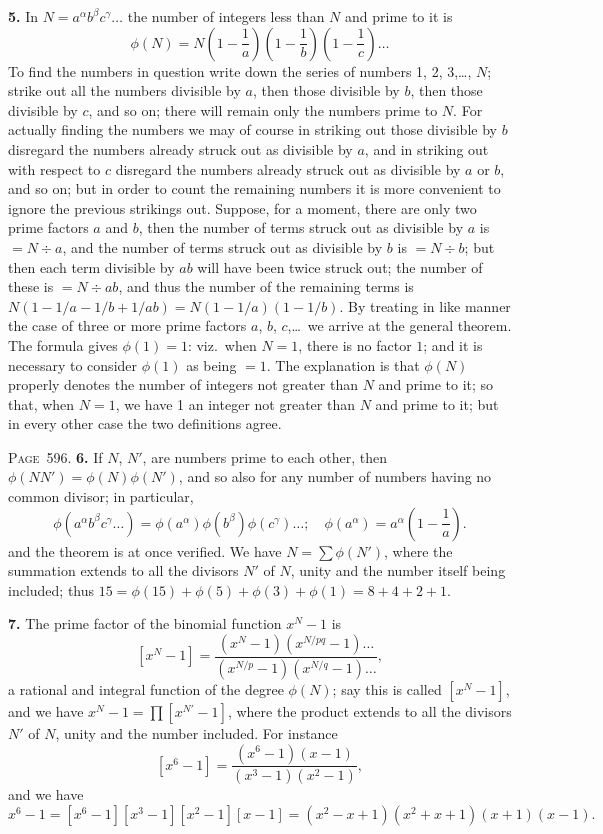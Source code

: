 \documentclass[11pt,a4paper]{book}
\begin{document}
\textbf{5.} In $N=a^\alpha b^\beta c^\gamma\ldots$ the number of integers less than $N$ and prime to it is
\[
\phi(N)=N\left(1-\frac{1}{a}\right)\left(1-\frac{1}{b}\right)\left(1-\frac{1}{c}\right)\ldots
\]
To find the numbers in question write down the series of numbers 1, 2, 3,\ldots, $N$; strike out all the numbers divisible by $a$, then those divisible by $b$, then those divisible by $c$, and so on; there will remain only the numbers prime to $N$. For actually finding the numbers we may of course in striking out those divisible by $b$ disregard the numbers already struck out as divisible by $a$, and in striking out with respect to $c$ disregard the numbers already struck out as divisible by $a$ or $b$, and so on; but in order to count the remaining numbers it is more convenient to ignore the previous strikings out. Suppose, for a moment, there are only two prime factors $a$ and $b$, then the number of terms struck out as divisible by $a$ is $=N\div a$, and the number of terms struck out as divisible by $b$ is $=N\div b$; but then each term divisible by $ab$ will have been twice struck out; the number of these is $=N\div ab$, and thus the number of the remaining terms is $N(1-1/a-1/b+1/ab)=N(1-1/a)(1-1/b)$. By treating in like manner the case of three or more prime factors $a$, $b$, $c$,\ldots\ we arrive at the general theorem. The formula gives $\phi(1)=1$: viz.\ when $N=1$, there is no factor $1$; and it is necessary to consider $\phi(1)$ as being $=1$. The explanation is that $\phi(N)$ properly denotes the number of integers not greater than $N$ and prime to it; so that, when $N=1$, we have 1 an integer not greater than $N$ and prime to it; but in every other case the two definitions agree.

\newpage
\noindent\textsc{Page~596.} \textbf{6.} If $N$, $N'$, are numbers prime to each other, then $\phi(NN')=\phi(N)\phi(N')$, and so also for any number of numbers having no common divisor; in particular,
\[
\phi(a^\alpha b^\beta c^\gamma\ldots)=\phi(a^\alpha)\phi(b^\beta)\phi(c^\gamma)\ldots;\quad
\phi(a^\alpha)=a^\alpha\left(1-\frac{1}{a}\right).
\]
and the theorem is at once verified. We have $N=\sum\phi(N')$, where the summation extends to all the divisors $N'$ of $N$, unity and the number itself being included; thus $15=\phi(15)+\phi(5)+\phi(3)+\phi(1)=8+4+2+1$.

\textbf{7.} The prime factor of the binomial function $x^N-1$ is
\[
[x^N-1]=\frac{(x^N-1)(x^{N/pq}-1)\ldots}{(x^{N/p}-1)(x^{N/q}-1)\ldots},
\]
a rational and integral function of the degree $\phi(N)$; say this is called $[x^N-1]$, and we have $x^N-1=\prod[x^{N'}-1]$, where the product extends to all the divisors $N'$ of $N$, unity and the number included. For instance
\[
[x^6-1]=\frac{(x^6-1)(x-1)}{(x^3-1)(x^2-1)},
\]
and we have
\[
x^6-1=[x^6-1][x^3-1][x^2-1][x-1]=(x^2-x+1)(x^2+x+1)(x+1)(x-1).
\]
\end{document}
